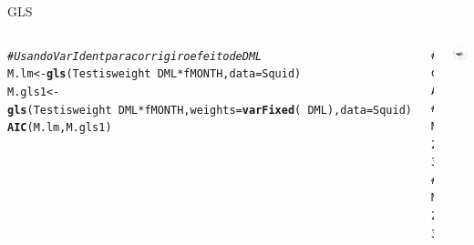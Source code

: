 \documentclass{beamer}\usepackage[]{graphicx}\usepackage[]{color}
\makeatletter
\newcommand{\hlcom}[1]{\textcolor[rgb]{0.678,0.584,0.686}{\textit{#1}}}%
\newcommand{\hlopt}[1]{\textcolor[rgb]{0,0,0}{#1}}%
\newcommand{\hlstd}[1]{\textcolor[rgb]{0.345,0.345,0.345}{#1}}%
\newcommand{\hlkwb}[1]{\textcolor[rgb]{0.69,0.353,0.396}{#1}}%
\newcommand{\hlkwc}[1]{\textcolor[rgb]{0.333,0.667,0.333}{#1}}%
\newcommand{\hlkwd}[1]{\textcolor[rgb]{0.737,0.353,0.396}{\textbf{#1}}}%
\newenvironment{kframe}{%
 \def\at@end@of@kframe{}%
 \ifinner\ifhmode%
  \def\at@end@of@kframe{\end{minipage}}%
  \begin{minipage}{\columnwidth}%
 \fi\fi%
 \def\FrameCommand##1{\hskip\@totalleftmargin \hskip-\fboxsep
 \colorbox{shadecolor}{##1}\hskip-\fboxsep
     \hskip-\linewidth \hskip-\@totalleftmargin \hskip\columnwidth}%
 \MakeFramed {\advance\hsize-\width
   \@totalleftmargin\z@ \linewidth\hsize
   \@setminipage}}%
 {\par\unskip\endMakeFramed%
 \at@end@of@kframe}
\newenvironment{knitrout}{}{} %
\renewenvironment{knitrout}{\setlength{\topsep}{0mm}}{}
\makeatother
\begin{document}
\begin{frame}[fragile]{GLS}

\begin{columns}[c]

\setlength{\topsep}{2pt}
\begin{knitrout}\tiny
{}\color{fgcolor}\begin{kframe}
\begin{alltt}
\hlcom{# Usando VarIdent para corrigir o efeito de DML}
\hlstd{M.lm}\hlkwb{<-}\hlkwd{gls}\hlstd{(Testisweight}\hlopt{~}\hlstd{DML}\hlopt{*}\hlstd{fMONTH,}\hlkwc{data}\hlstd{=Squid)}
\hlstd{M.gls1}\hlkwb{<-}\hlkwd{gls}\hlstd{(Testisweight}\hlopt{~}\hlstd{DML}\hlopt{*}\hlstd{fMONTH,}\hlkwc{weights}\hlstd{=}\hlkwd{varFixed}\hlstd{(}\hlopt{~}\hlstd{DML),}\hlkwc{data}\hlstd{=Squid)}
\hlkwd{AIC}\hlstd{(M.lm,M.gls1)}
\end{alltt}
\begin{verbatim}
##        df      AIC
## M.lm   25 3752.084
## M.gls1 25 3620.898
\end{verbatim}
\end{kframe}
\end{knitrout}

\begin{knitrout}
\color{fgcolor}
\includegraphics[width=0.7\linewidth]{figure/glsp2-1} 


\end{knitrout}
\end{columns}
\end{frame}
\end{document}
